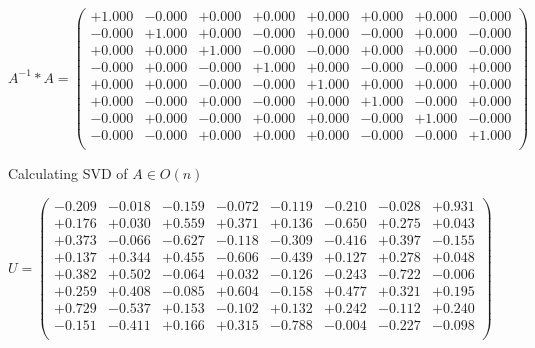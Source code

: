 \documentclass[9pt]{article}
\theoremstyle{plain}
\theoremstyle{definition}
\theoremstyle{remark}
\numberwithin{equation}{section}
\begin{document}
$A^{-1} *A = \left(
\begin{array}{
cccccccc}
+1.000 & -0.000 & +0.000 & +0.000 & +0.000 & +0.000 & +0.000 & -0.000 \\
-0.000 & +1.000 & +0.000 & -0.000 & +0.000 & -0.000 & +0.000 & -0.000 \\
+0.000 & +0.000 & +1.000 & -0.000 & -0.000 & +0.000 & +0.000 & -0.000 \\
-0.000 & +0.000 & -0.000 & +1.000 & +0.000 & -0.000 & -0.000 & +0.000 \\
+0.000 & +0.000 & -0.000 & -0.000 & +1.000 & +0.000 & +0.000 & +0.000 \\
+0.000 & -0.000 & +0.000 & -0.000 & +0.000 & +1.000 & -0.000 & +0.000 \\
-0.000 & +0.000 & -0.000 & +0.000 & +0.000 & -0.000 & +1.000 & -0.000 \\
-0.000 & -0.000 & +0.000 & +0.000 & +0.000 & -0.000 & -0.000 & +1.000 \\
\end{array}
\right)$ \newline 

Calculating SVD of  $A \in O(n)$

$U = \left(
\begin{array}{
cccccccc}
-0.209 & -0.018 & -0.159 & -0.072 & -0.119 & -0.210 & -0.028 & +0.931 \\
+0.176 & +0.030 & +0.559 & +0.371 & +0.136 & -0.650 & +0.275 & +0.043 \\
+0.373 & -0.066 & -0.627 & -0.118 & -0.309 & -0.416 & +0.397 & -0.155 \\
+0.137 & +0.344 & +0.455 & -0.606 & -0.439 & +0.127 & +0.278 & +0.048 \\
+0.382 & +0.502 & -0.064 & +0.032 & -0.126 & -0.243 & -0.722 & -0.006 \\
+0.259 & +0.408 & -0.085 & +0.604 & -0.158 & +0.477 & +0.321 & +0.195 \\
+0.729 & -0.537 & +0.153 & -0.102 & +0.132 & +0.242 & -0.112 & +0.240 \\
-0.151 & -0.411 & +0.166 & +0.315 & -0.788 & -0.004 & -0.227 & -0.098 \\
\end{array}
\right)$ \newline 
\end{document}
